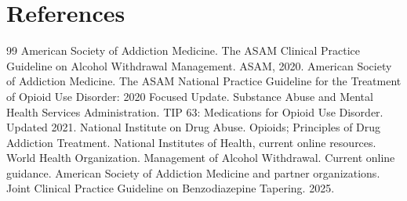 \section*{References}
\begin{thebibliography}{99}
 American Society of Addiction Medicine. The ASAM Clinical Practice Guideline on Alcohol Withdrawal Management. ASAM, 2020.
 American Society of Addiction Medicine. The ASAM National Practice Guideline for the Treatment of Opioid Use Disorder: 2020 Focused Update.
 Substance Abuse and Mental Health Services Administration. TIP 63: Medications for Opioid Use Disorder. Updated 2021.
 National Institute on Drug Abuse. Opioids; Principles of Drug Addiction Treatment. National Institutes of Health, current online resources.
 World Health Organization. Management of Alcohol Withdrawal. Current online guidance.
 American Society of Addiction Medicine and partner organizations. Joint Clinical Practice Guideline on Benzodiazepine Tapering. 2025.
\end{thebibliography}
